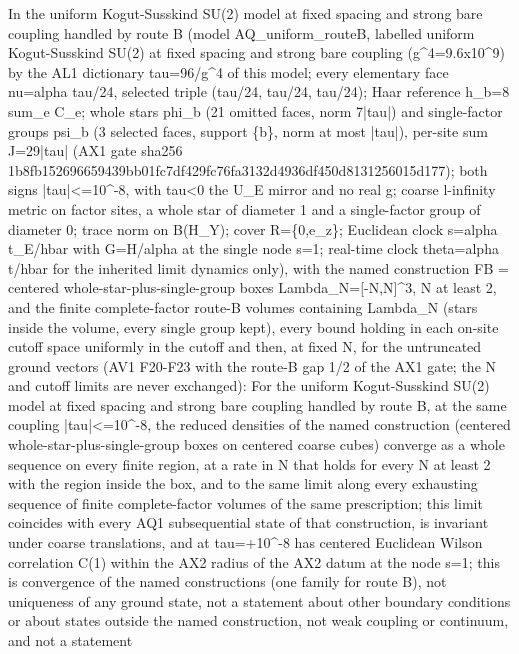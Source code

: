 \begin{gatequote}
In the uniform Kogut-Susskind SU(2) model at fixed spacing and strong bare
coupling handled by route B (model AQ\_uniform\_routeB, labelled uniform
Kogut-Susskind SU(2) at fixed spacing and strong bare coupling
(g\textasciicircum{}4=9.6x10\textasciicircum{}9) by the AL1 dictionary
tau=96/g\textasciicircum{}4 of this model; every elementary face nu=alpha
tau/24, selected triple (tau/24, tau/24, tau/24); Haar reference h\_b=8 sum\_e
C\_e; whole stars phi\_b (21 omitted faces, norm 7|tau|) and single-factor
groups psi\_b (3 selected faces, support \{b\}, norm at most |tau|), per-site
sum J\textquotesingle{}=29|tau| (AX1 gate sha256
1b8fb152696659439bb01fc7df429fc76fa3132d4936df450d8131256015d177); both signs
|tau|<=10\textasciicircum{}-8, with tau<0 the U\_E mirror and no real g;
coarse l-infinity metric on factor sites, a whole star of diameter 1 and a
single-factor group of diameter 0; trace norm on B(H\_Y); cover R=\{0,e\_z\};
Euclidean clock s=alpha t\_E/hbar with G=H/alpha at the single node s=1;
real-time clock theta=alpha t/hbar for the inherited limit dynamics only),
with the named construction FB = centered whole-star-plus-single-group boxes
Lambda\_N=[-N,N]\textasciicircum{}3, N at least 2, and the finite
complete-factor route-B volumes containing Lambda\_N (stars inside the volume,
every single group kept), every bound holding in each on-site cutoff space
uniformly in the cutoff and then, at fixed N, for the untruncated ground
vectors (AV1 F20-F23 with the route-B gap 1/2 of the AX1 gate; the N and
cutoff limits are never exchanged): For the uniform Kogut-Susskind SU(2) model
at fixed spacing and strong bare coupling handled by route B, at the same
coupling |tau|<=10\textasciicircum{}-8, the reduced densities of the named
construction (centered whole-star-plus-single-group boxes on centered coarse
cubes) converge as a whole sequence on every finite region, at a rate in N
that holds for every N at least 2 with the region inside the box, and to the
same limit along every exhausting sequence of finite complete-factor volumes
of the same prescription; this limit coincides with every AQ1 subsequential
state of that construction, is invariant under coarse translations, and at
tau=+10\textasciicircum{}-8 has centered Euclidean Wilson correlation C(1)
within the AX2 radius of the AX2 datum at the node s=1; this is convergence of
the named constructions (one family for route B), not uniqueness of any ground
state, not a statement about other boundary conditions or about states outside
the named construction, not weak coupling or continuum, and not a statement

\end{gatequote}
